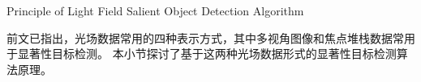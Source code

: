 %
%
%
%
%
%
%
%
%
%
%
%
%
%
%
%
%
%










{Principle of Light Field Salient Object Detection Algorithm}

%
%
%
%
%
%
前文已指出，光场数据常用的四种表示方式，其中多视角图像和焦点堆栈数据常用于显著性目标检测。
本小节探讨了基于这两种光场数据形式的显著性目标检测算法原理。

%
%






